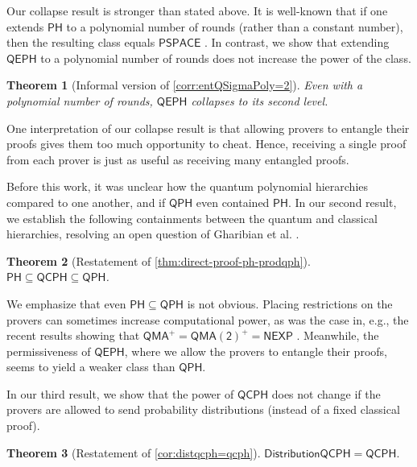 \documentclass[11pt]{article}
\newtheorem{theorem}{Theorem}[section]
\theoremstyle{definition}
\newcommand{\class}[1]{\ensuremath{\mathsf{#1}}\xspace}
\newcommand{\NEXP}{\class{NEXP}}
\newcommand{\PSPACE}{\class{PSPACE}}
\newcommand{\QMA}{\class{QMA}}
\newcommand{\QMAk}[1][k]{\class{QMA(#1)}}
\newcommand{\QMAtwo}{\QMAk[2]}
\newcommand{\PH}{\class{PH}}
\newcommand{\QCPH}{\class{QCPH}}
\newcommand{\QPH}{\class{QPH}}
\newcommand{\QEPH}{\class{QEPH}}
\newcommand{\distributionQCPH}{\mathsf{DistributionQCPH}}
\begin{document}
Our collapse result is stronger than stated above.
It is well-known that if one extends $\PH$ to a polynomial number of rounds (rather than a constant number), then the resulting class equals $\PSPACE$ \cite[Theorem 4.11]{arora2009computational}.
In contrast, we show that extending $\QEPH$ to a polynomial number of rounds does not increase the power of the class. 

\begin{theorem}[Informal version of \cref{corr:entQSigmaPoly=2}]
   Even with a polynomial number of rounds, $\QEPH$ collapses to its second level.
\end{theorem}

One interpretation of our collapse result is that allowing provers to entangle their proofs gives them too much opportunity to cheat. Hence, receiving a single proof from each prover is just as useful as receiving many entangled proofs. 

Before this work, it was unclear how the quantum polynomial hierarchies compared to one another, and if $\QPH$ even contained $\PH$. 
In our second result, we establish the following containments between the quantum and classical hierarchies, resolving an open question of Gharibian et al. \cite{GSSSY22_qph}.

\begin{theorem}[Restatement of \cref{thm:direct-proof-ph-prodqph}]
    $\PH \subseteq \QCPH \subseteq \QPH$.
\end{theorem}

We emphasize that even $\PH \subseteq \QPH$ is not obvious.
Placing restrictions on the provers can sometimes increase computational power, as was the case in, e.g., the recent results showing that $\QMA^+ = \QMAtwo^+ = \NEXP$ \cite{jeronimo2023power, bassirian2023quantum}. 
Meanwhile, the permissiveness of $\QEPH$, where we allow the provers to entangle their proofs, seems to yield a weaker class than $\QPH$. 


In our third result, we show that the power of $\QCPH$ does not change if the provers are allowed to send probability distributions (instead of a fixed classical proof). 

\begin{theorem}[Restatement of \cref{cor:distqcph=qcph}]\label{thm:intro-distqcph=qcph}
   $\distributionQCPH = \QCPH.$
\end{theorem}
\end{document}
